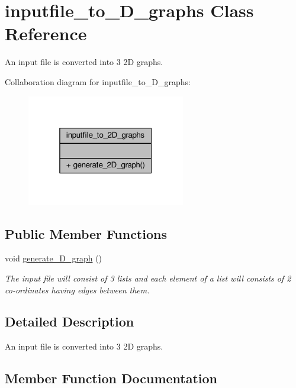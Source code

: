\hypertarget{classinputfile__to__2D__graphs}{}\section{inputfile\+\_\+to\+\_\+D\+\_\+graphs Class Reference}
\label{classinputfile__to__2D__graphs}


An input file is converted into 3 2D graphs.  




Collaboration diagram for inputfile\+\_\+to\+\_\+D\+\_\+graphs\+:\nopagebreak
\begin{figure}[H]
\begin{center}
\leavevmode
\includegraphics[width=196pt]{classinputfile__to__2D__graphs__coll__graph}
\end{center}
\end{figure}
\subsection*{Public Member Functions}
\begin{DoxyCompactItemize}
\item 
void \hyperlink{classinputfile__to__2D__graphs_af3d5444f4f09a556f66f6fbf9602aaa5}{generate\+\_\+D\+\_\+graph} ()
\begin{DoxyCompactList}\small\item\em The input file will consist of 3 lists and each element of a list will consists of 2 co-\/ordinates having edges between them. \end{DoxyCompactList}\end{DoxyCompactItemize}


\subsection{Detailed Description}
An input file is converted into 3 2D graphs. 

\subsection{Member Function Documentation}
